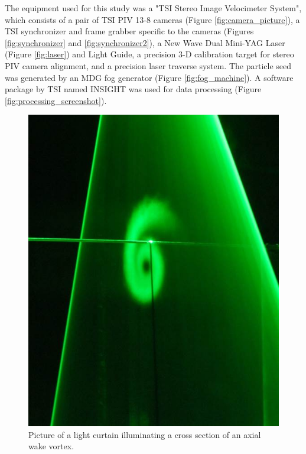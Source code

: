 The equipment used for this study was a "TSI Stereo Image Velocimeter System", 
which consists of a pair of TSI PIV 13-8 cameras (Figure 
\ref{fig:camera_picture}), a TSI synchronizer and frame 
grabber specific to the cameras (Figures \ref{fig:synchronizer} and 
\ref{fig:synchronizer2}), a New Wave Dual Mini-YAG Laser (Figure 
\ref{fig:laser}) and Light Guide, a precision 3-D calibration target for stereo 
PIV camera alignment, and a precision laser traverse system. The particle seed 
was generated by an MDG fog generator (Figure \ref{fig:fog_machine}). A 
software package by TSI named INSIGHT was used for data processing (Figure 
\ref{fig:processing_screenshot}).

\begin{figure}[H]
	\centering
	\includegraphics[width=5in]{figs/piv_method/laser_sheet_picture}
	\caption{Picture of a light curtain illuminating a cross section of an 
	axial wake vortex.}
	\label{fig:laser_sheet_picture}
\end{figure}

